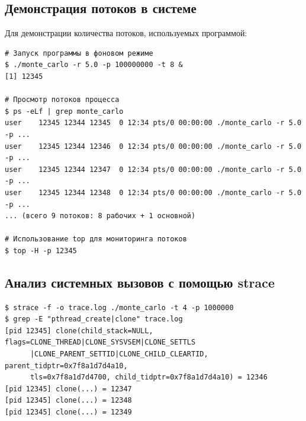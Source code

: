 \subsection{Демонстрация потоков в системе}
Для демонстрации количества потоков, используемых программой:
\begin{verbatim}
# Запуск программы в фоновом режиме
$ ./monte_carlo -r 5.0 -p 100000000 -t 8 &
[1] 12345

# Просмотр потоков процесса
$ ps -eLf | grep monte_carlo
user    12345 12344 12345  0 12:34 pts/0 00:00:00 ./monte_carlo -r 5.0 -p ...
user    12345 12344 12346  0 12:34 pts/0 00:00:00 ./monte_carlo -r 5.0 -p ...
user    12345 12344 12347  0 12:34 pts/0 00:00:00 ./monte_carlo -r 5.0 -p ...
user    12345 12344 12348  0 12:34 pts/0 00:00:00 ./monte_carlo -r 5.0 -p ...
... (всего 9 потоков: 8 рабочих + 1 основной)

# Использование top для мониторинга потоков
$ top -H -p 12345
\end{verbatim}

\subsection{Анализ системных вызовов с помощью strace}
\begin{verbatim}
$ strace -f -o trace.log ./monte_carlo -t 4 -p 1000000
$ grep -E "pthread_create|clone" trace.log
[pid 12345] clone(child_stack=NULL, flags=CLONE_THREAD|CLONE_SYSVSEM|CLONE_SETTLS
      |CLONE_PARENT_SETTID|CLONE_CHILD_CLEARTID, parent_tidptr=0x7f8a1d7d4a10,
      tls=0x7f8a1d7d4700, child_tidptr=0x7f8a1d7d4a10) = 12346
[pid 12345] clone(...) = 12347
[pid 12345] clone(...) = 12348
[pid 12345] clone(...) = 12349
\end{verbatim}